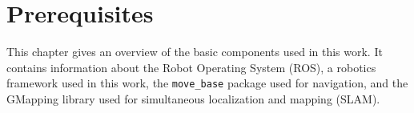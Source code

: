 \chapter{Prerequisites}

This chapter gives an overview of the basic components used in this work. It contains information about the Robot Operating System (ROS), a robotics framework used in this work, the \texttt{move{\_}base} package used for navigation, and the GMapping library used for simultaneous localization and mapping (SLAM).

%
%


%

%
%